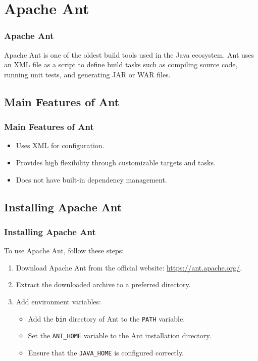 \documentclass[aspectratio=169, table]{beamer}
\begin{document}
\section{Apache Ant}

\begin{frame}
	\frametitle{Apache Ant}
	Apache Ant is one of the oldest build tools used in the Java ecosystem. Ant uses an XML file as a script to define build tasks such as compiling source code, running unit tests, and generating JAR or WAR files.
\end{frame}

\subsection{Main Features of Ant}

\begin{frame}
	\frametitle{Main Features of Ant}
	\begin{itemize}
		\item Uses XML for configuration.
		\item Provides high flexibility through customizable targets and tasks.
		\item Does not have built-in dependency management.
	\end{itemize}
\end{frame}

\subsection{Installing Apache Ant}

\begin{frame}
	\frametitle{Installing Apache Ant}
	To use Apache Ant, follow these steps:
	\begin{enumerate}
		\item Download Apache Ant from the official website: \url{https://ant.apache.org/}.
		\item Extract the downloaded archive to a preferred directory.
		\item Add environment variables:
		\begin{itemize}
			\item Add the \texttt{bin} directory of Ant to the \texttt{PATH} variable.
			\item Set the \texttt{ANT\_HOME} variable to the Ant installation directory.
			\item Ensure that the \texttt{JAVA\_HOME} is configured correctly.
		\end{itemize}
	\end{enumerate}
\end{frame}
\end{document}
